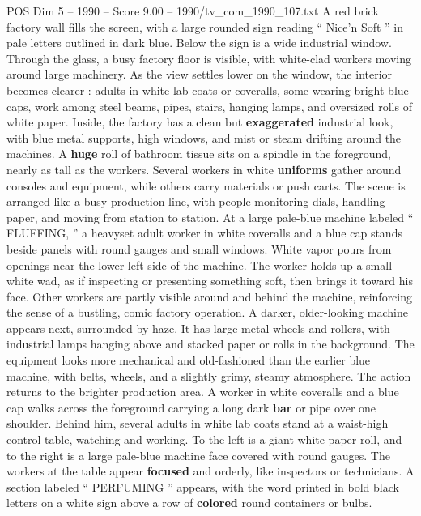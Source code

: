 \begin{textsample}{POS Dim 5 – 1990 – Score 9.00 – 1990/tv\_com\_1990\_107.txt}  \label{ex:f5_pos_014}
A red brick factory wall fills the screen, with a large rounded sign reading “ Nice’n Soft ” in pale letters outlined in dark blue.
Below the sign is a wide industrial window.
Through the glass, a busy factory floor is visible, with white-clad workers moving around large machinery.
As the view settles lower on the window, the interior becomes clearer : adults in white lab coats or coveralls, some wearing bright blue caps, work among steel beams, pipes, stairs, hanging lamps, and oversized rolls of white paper.
Inside, the factory has a clean but \textbf{exaggerated} industrial look, with blue metal supports, high windows, and mist or steam drifting around the machines.
A \textbf{huge} roll of bathroom tissue sits on a spindle in the foreground, nearly as tall as the workers.
Several workers in white \textbf{uniforms} gather around consoles and equipment, while others carry materials or push carts.
The scene is arranged like a busy production line, with people monitoring dials, handling paper, and moving from station to station.
At a large pale-blue machine labeled “ FLUFFING, ” a heavyset adult worker in white coveralls and a blue cap stands beside panels with round gauges and small windows.
White vapor pours from openings near the lower left side of the machine.
The worker holds up a small white wad, as if inspecting or presenting something soft, then brings it toward his face.
Other workers are partly visible around and behind the machine, reinforcing the sense of a bustling, comic factory operation.
A darker, older-looking machine appears next, surrounded by haze.
It has large metal wheels and rollers, with industrial lamps hanging above and stacked paper or rolls in the background.
The equipment looks more mechanical and old-fashioned than the earlier blue machine, with belts, wheels, and a slightly grimy, steamy atmosphere.
The action returns to the brighter production area.
A worker in white coveralls and a blue cap walks across the foreground carrying a long dark \textbf{bar} or pipe over one shoulder.
Behind him, several adults in white lab coats stand at a waist-high control table, watching and working.
To the left is a giant white paper roll, and to the right is a large pale-blue machine face covered with round gauges.
The workers at the table appear \textbf{focused} and orderly, like inspectors or technicians.
A section labeled “ PERFUMING ” appears, with the word printed in bold black letters on a white sign above a row of \textbf{colored} round containers or bulbs.

\end{textsample}
